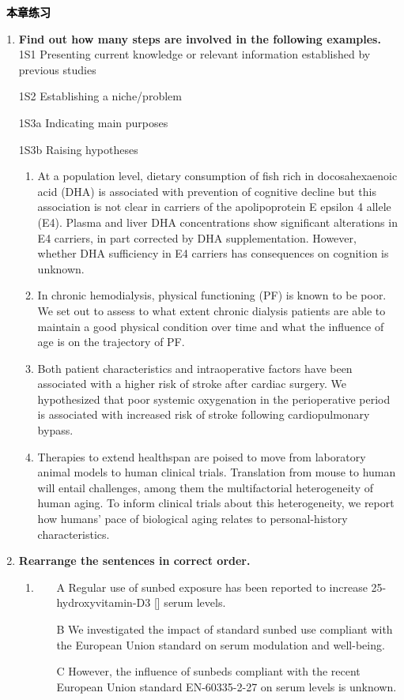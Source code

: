 \documentclass[a4paper]{ctexbook}
\newenvironment{problemset}[1][本章练习]{
  \begin{center}
    \phantomsection\addcontentsline{toc}{section}{\texorpdfstring{本章练习}{Exercice}}
    \markright{#1}
    \textcolor{black}{\Large\bfseries\adftripleflourishleft~#1~\adftripleflourishright}
  \end{center}
  \begin{enumerate}}{
  \end{enumerate}}
\begin{document}
\begin{problemset}
  \item \textbf{Find out how many steps are involved in the following examples.}
  1S1 Presenting current knowledge or relevant information established by previous studies

  1S2 Establishing a niche/problem

  1S3a Indicating main purposes

  1S3b Raising hypotheses

  \begin{enumerate}
    \item At a population level, dietary consumption of fish rich in docosahexaenoic acid (DHA) is associated with prevention of cognitive decline but this association is not clear in carriers of the apolipoprotein E epsilon 4 allele (E4). Plasma and liver DHA concentrations show significant alterations in E4 carriers, in part corrected by DHA supplementation. However, whether DHA sufficiency in E4 carriers has consequences on cognition is unknown.
    \item In chronic hemodialysis, physical functioning (PF) is known to be poor. We set out to assess to what extent chronic dialysis patients are able to maintain a good physical condition over time and what the influence of age is on the trajectory of PF.
    \item Both patient characteristics and intraoperative factors have been associated with a higher risk of stroke after cardiac surgery. We hypothesized that poor systemic oxygenation in the perioperative period is associated with increased risk of stroke following cardiopulmonary bypass.
    \item Therapies to extend healthspan are poised to move from laboratory animal models to human clinical trials. Translation from mouse to human will entail challenges, among them the multifactorial heterogeneity of human aging. To inform clinical trials about this heterogeneity, we report how humans' pace of biological aging relates to personal-history characteristics.
  \end{enumerate}

  \item \textbf{Rearrange the sentences in correct order.}

  \begin{enumerate}
    \item \uline{\hspace*{3em}}
    \begin{itemize}
      \item[A] Regular use of sunbed exposure has been reported to increase 25-hydroxyvitamin-D3 [] serum levels.
      \item[B] We investigated the impact of standard sunbed use compliant with the European Union standard on  serum modulation and well-being.
      \item[C] However, the influence of sunbeds compliant with the recent European Union standard EN-60335-2-27 on  serum levels is unknown.
    \end{itemize}


\end{enumerate}
\end{problemset}
\end{document}
